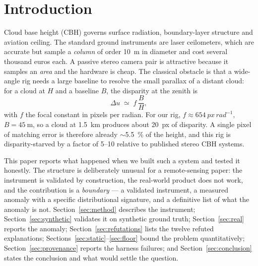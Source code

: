 \documentclass[11pt,a4paper]{article}
\newcommand{\du}{\ensuremath{\Delta u}}
\begin{document}
\begin{abstract}
Finally we report, as a first-class result, the six methodological defects found in our own
harness. All six shared one mechanism---\emph{a quantity read from somewhere other than where
it was claimed to come from}---none raised an exception, and two made the results look
\emph{more} significant than the truth. We propose and implement \emph{provenance assertions}
as a guardrail for computational remote sensing.

\medskip
\noindent\textbf{Keywords:} cloud base height, stereo vision, fisheye, ceilometer, negative
result, reproducibility, provenance.
\end{abstract}

\section{Introduction}

Cloud base height (CBH) governs surface radiation, boundary-layer structure and aviation
ceiling. The standard ground instruments are laser ceilometers, which are accurate but sample
a \emph{column} of order \SI{10}{\metre} in diameter and cost several thousand euros each.
A passive stereo camera pair is attractive because it samples an \emph{area} and the hardware
is cheap. The classical obstacle is that a wide-angle rig needs a large baseline to resolve
the small parallax of a distant cloud: for a cloud at $H$ and a baseline $B$, the disparity at
the zenith is
\begin{equation}
\du \;\simeq\; f\,\frac{B}{H},
\label{eq:parallax}
\end{equation}
with $f$ the focal constant in pixels per radian. For our rig,
$f \approx \SI{654}{px\,rad^{-1}}$, $B = \SI{45}{\metre}$, so a cloud at \SI{1.5}{\km}
produces about \SI{20}{px} of disparity. A single pixel of matching error is therefore
already $\sim$\SI{5.5}{\percent} of the height, and this rig is disparity-starved by a factor
of 5--10 relative to published stereo CBH systems.

This paper reports what happened when we built such a system and tested it honestly. The
structure is deliberately unusual for a remote-sensing paper: the instrument is validated by
construction, the real-world product does not work, and the contribution is a
\emph{boundary} --- a validated instrument, a measured anomaly with a specific distributional
signature, and a definitive list of what the anomaly is not. Section~\ref{sec:method}
describes the instrument; Section~\ref{sec:synthetic} validates it on synthetic ground truth;
Section~\ref{sec:real} reports the anomaly; Section~\ref{sec:refutations} lists the twelve
refuted explanations; Sections~\ref{sec:static}--\ref{sec:floor} bound the problem
quantitatively; Section~\ref{sec:provenance} reports the harness failures; and
Section~\ref{sec:conclusion} states the conclusion and what would settle the question.
\end{document}
